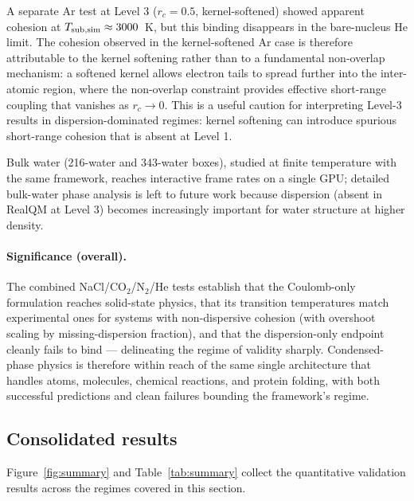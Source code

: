 \documentclass[11pt]{article}
\begin{document}
A separate Ar test at Level 3 ($r_c = 0.5$, kernel-softened) showed apparent cohesion at $T_{\rm sub,sim} \approx 3000$~K, but this binding disappears in the bare-nucleus He limit. The cohesion observed in the kernel-softened Ar case is therefore attributable to the kernel softening rather than to a fundamental non-overlap mechanism: a softened kernel allows electron tails to spread further into the inter-atomic region, where the non-overlap constraint provides effective short-range coupling that vanishes as $r_c \to 0$. This is a useful caution for interpreting Level-3 results in dispersion-dominated regimes: kernel softening can introduce spurious short-range cohesion that is absent at Level 1.

Bulk water (216-water and 343-water boxes), studied at finite temperature with the same framework, reaches interactive frame rates on a single GPU; detailed bulk-water phase analysis is left to future work because dispersion (absent in RealQM at Level 3) becomes increasingly important for water structure at higher density.

\paragraph{Significance (overall).}
The combined NaCl/CO$_2$/N$_2$/He tests establish that the Coulomb-only formulation reaches solid-state physics, that its transition temperatures match experimental ones for systems with non-dispersive cohesion (with overshoot scaling by missing-dispersion fraction), and that the dispersion-only endpoint cleanly fails to bind --- delineating the regime of validity sharply. Condensed-phase physics is therefore within reach of the same single architecture that handles atoms, molecules, chemical reactions, and protein folding, with both successful predictions and clean failures bounding the framework's regime.

\subsection{Consolidated results}\label{sec:summary}

Figure~\ref{fig:summary} and Table~\ref{tab:summary} collect the quantitative validation results across the regimes covered in this section.
\end{document}
